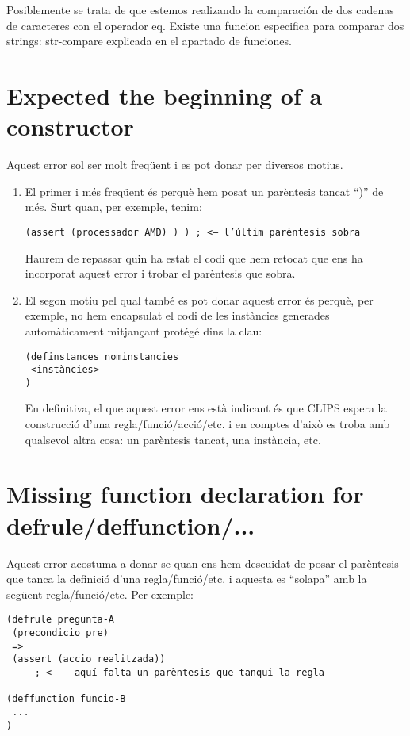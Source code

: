 \documentclass[11pt,svgnames]{scrbook}
\begin{document}
Posiblemente se trata de que estemos realizando la comparación de dos cadenas de caracteres con el operador eq. Existe una funcion especifica para comparar dos strings: str-compare explicada en el apartado de funciones.


\section{Expected the beginning of a constructor}


Aquest error sol ser molt freqüent i es pot donar per diversos motius.

\begin{enumerate}
 \item El primer i més freqüent és perquè hem posat un parèntesis tancat ``)'' de més. Surt quan, per exemple, tenim:

\texttt{(assert (processador AMD) ) ) ; <-- l'últim parèntesis sobra}

Haurem de repassar quin ha estat el codi que hem retocat que ens ha incorporat aquest error i trobar el parèntesis que sobra.
\item El segon motiu pel qual també es pot donar aquest error és perquè, per exemple, no hem encapsulat el codi de les instàncies generades automàticament mitjançant protégé dins la clau:

\begin{verbatim}
(definstances nominstancies
 <instàncies>
)
\end{verbatim}
En definitiva, el que aquest error ens està indicant és que CLIPS espera la construcció d'una regla/funció/acció/etc. i en comptes d'això es troba amb qualsevol altra cosa: un parèntesis tancat, una instància, etc.
\end{enumerate}



\section{Missing function declaration for defrule/deffunction/...}


Aquest error acostuma a donar-se quan ens hem descuidat de posar el parèntesis que tanca la definició d'una regla/funció/etc. i aquesta es ``solapa'' amb la següent regla/funció/etc.
Per exemple:

\begin{verbatim}
(defrule pregunta-A
 (precondicio pre)
 =>
 (assert (accio realitzada))
     ; <--- aquí falta un parèntesis que tanqui la regla

(deffunction funcio-B
 ...
)\end{verbatim}
\end{document}
